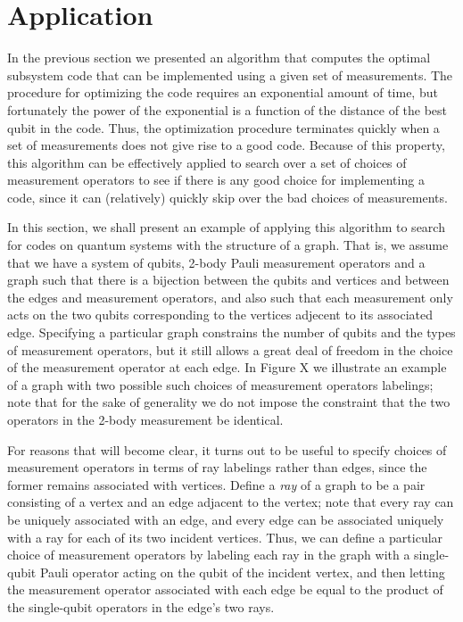 \documentclass[twocolumn,showpacs,preprintnumbers,amsmath,amssymb,nofootinbib,pra,floatfix]{revtex4-1}
\begin{document}
\section{Application} \label{sec:lattice}

In the previous section we presented an algorithm that computes the optimal subsystem code that can be implemented using a given set of measurements.  The procedure for optimizing the code requires an exponential amount of time, but fortunately the power of the exponential is a function of the distance of the best qubit in the code.  Thus, the optimization procedure terminates quickly when a set of measurements does not give rise to a good code.  Because of this property, this algorithm can be effectively applied to search over a set of choices of measurement operators to see if there is any good choice for implementing a code, since it can (relatively) quickly skip over the bad choices of measurements.

In this section, we shall present an example of applying this algorithm to search for codes on quantum systems with the structure of a graph.  That is, we assume that we have a system of qubits, 2-body Pauli measurement operators and a graph such that there is a bijection between the qubits and vertices and between the edges and measurement operators, and also such that each measurement only acts on the two qubits corresponding to the vertices adjecent to its associated edge.  Specifying a particular graph constrains the number of qubits and the types of measurement operators, but it still allows a great deal of freedom in the choice of the measurement operator at each edge.  In Figure X we illustrate an example of a graph with two possible such choices of measurement operators labelings;  note that for the sake of generality we do not impose the constraint that the two operators in the 2-body measurement be identical.

For reasons that will become clear, it turns out to be useful to specify choices of measurement operators in terms of ray labelings rather than edges, since the former remains associated with vertices.  Define a \emph{ray} of a graph to be a pair consisting of a vertex and an edge adjacent to the vertex;  note that every ray can be uniquely associated with an edge, and every edge can be associated uniquely with a ray for each of its two incident vertices.  Thus, we can define a particular choice of measurement operators by labeling each ray in the graph with a single-qubit Pauli operator acting on the qubit of the incident vertex, and then letting the measurement operator associated with each edge be equal to the product of the single-qubit operators in the edge's two rays.
\end{document}
